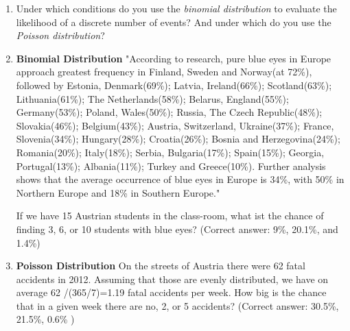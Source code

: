 \begin{enumerate}

    \item Under which conditions do you use the \emph{binomial distribution} to evaluate the likelihood of a discrete number of events? And under which do you use the \emph{Poisson distribution}?

    \item \textbf{Binomial Distribution} "According to research, pure blue eyes in Europe approach greatest frequency in Finland, Sweden and Norway(at 72\%), followed by Estonia, Denmark(69\%); Latvia, Ireland(66\%); Scotland(63\%); Lithuania(61\%); The Netherlands(58\%); Belarus, England(55\%); Germany(53\%); Poland, Wales(50\%); Russia, The Czech Republic(48\%); Slovakia(46\%); Belgium(43\%); Austria, Switzerland, Ukraine(37\%); France, Slovenia(34\%); Hungary(28\%); Croatia(26\%); Bosnia and Herzegovina(24\%); Romania(20\%); Italy(18\%); Serbia, Bulgaria(17\%); Spain(15\%); Georgia, Portugal(13\%); Albania(11\%); Turkey and Greece(10\%). Further analysis shows that the average occurrence of blue eyes in Europe is 34\%, with 50\% in Northern Europe and 18\% in Southern Europe."

    If we have 15 Austrian students in the class-room, what ist the chance of finding 3, 6, or 10 students with blue eyes?
    (Correct answer: 9\%, 20.1\%, and 1.4\%)

    \item \textbf{Poisson Distribution} On the streets of Austria there were 62 fatal accidents in 2012. Assuming that those are evenly distributed, we have on average
    62 /(365/7)=1.19 fatal accidents per week. How big is the chance that in a given week there are no, 2, or 5 accidents?
    (Correct answer: 30.5\%, 21.5\%, 0.6\% )
\end{enumerate}
